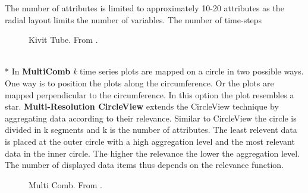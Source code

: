 The number of attributes is limited to approximately 10-20 attributes as the radial layout limits the number of variables. The number of time-steps 
\begin{figure}[H]
    \centering
    \caption{Kivit Tube. From \cite{Aigner2011}.}
    \label{fig:kiviattube}
\end{figure}
\\*
In \textbf{MultiComb} \textit{k} time series plots are mapped on a circle in two possible ways. One way is to position the plots along the circumference. Or the plots are mapped perpendicular to the circumference. In this option the plot resembles a star.  
\textbf{Multi-Resolution CircleView} extends the CircleView technique by aggregating data according to their relevance. Similar to CircleView the circle is divided in k segments and k is the number of attributes. The least relevent data is placed at the outer circle with a high aggregation level and the most relevant data in the inner circle. The higher the relevance the lower the aggregation level. The number of displayed data items thus depends on the relevance function. 
\begin{figure}[H]
    \centering
    \caption{Multi Comb. From \cite{Luo2012}.}
    \label{fig:multicomb}
\end{figure}

